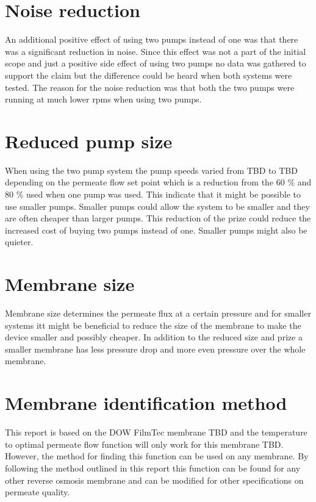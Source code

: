\section{Noise reduction}

An additional positive effect of using two pumps instead of one was that there was a significant reduction in noise. Since this effect was not a part of the initial scope and just a positive side effect of using two pumps no data was gathered to support the claim but the difference could be heard when both systems were tested. The reason for the noise reduction was that both the two pumps were running at much lower rpms when using two pumps. 

\section{Reduced pump size}
When using the two pump system the pump speeds varied from TBD to TBD depending on the permeate flow set point which is a reduction from the 60 \% and 80 \% used when one pump was used. This indicate that it might be possible to use smaller pumps. Smaller pumps could allow the system to be smaller and they are often cheaper than larger pumps. This reduction of the prize could reduce the increased cost of buying two pumps instead of one. Smaller pumps might also be quieter.

\section{Membrane size}
Membrane size determines the permeate flux at a certain pressure and for smaller systems itt might be beneficial to reduce the size of the membrane to make the device smaller and possibly cheaper. In addition to the reduced size and prize a smaller membrane has less pressure drop and more even pressure over the whole membrane.

\section{Membrane identification method}
This report is based on the DOW FilmTec membrane TBD and the temperature to optimal permeate flow function will only work for this membrane TBD. However, the method for finding this function can be used on any membrane. By following the method outlined in this report this function can be found for any other reverse osmosis membrane and can be modified for other specifications on permeate quality. 

